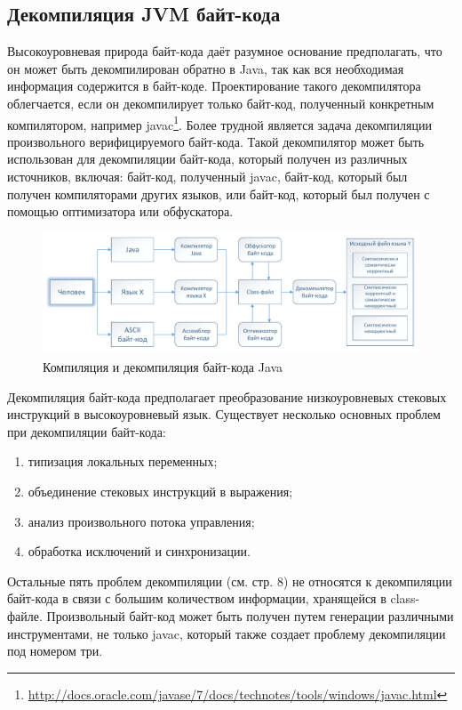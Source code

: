 \subsection{Декомпиляция JVM байт-кода}
Высокоуровневая природа байт-кода даёт разумное основание предполагать, что он может быть декомпилирован обратно в Java, так как вся необходимая информация содержится в байт-коде. Проектирование такого декомпилятора облегчается, если он декомпилирует только байт-код, полученный конкретным компилятором, например javac\footnote{\url{http://docs.oracle.com/javase/7/docs/technotes/tools/windows/javac.html}}. Более трудной является задача декомпиляции произвольного верифицируемого байт-кода. Такой декомпилятор может быть использован для декомпиляции байт-кода, который получен из различных источников, включая: байт-код, полученный javac,  байт-код, который был получен компиляторами других языков, или байт-код, который был получен с помощью оптимизатора или обфускатора\cite{bytecode}.

\begin{figure}[H]
\includegraphics[width=1\linewidth]{Zabransky/c_d.pdf}
\caption{Компиляция и декомпиляция байт-кода Java}
\end{figure}


Декомпиляция байт-кода предполагает преобразование низкоуровневых стековых инструкций в высокоуровневый язык. Существует несколько основных проблем при декомпиляции байт-кода:

\begin{enumerate}
\item типизация локальных переменных;
\item объединение стековых инструкций в выражения;
\item анализ произвольного потока управления;
\item обработка исключений и синхронизации.
\end{enumerate}

Остальные пять проблем декомпиляции (см. стр. 8) не относятся к декомпиляции байт-кода в связи с большим количеством информации, хранящейся в class-файле. Произвольный байт-код может быть получен путем генерации различными инструментами, не только javac, который также создает проблему декомпиляции под номером три.

